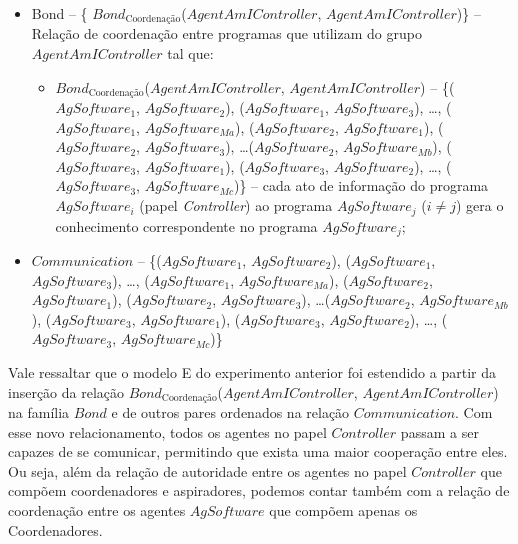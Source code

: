 \begin{itemize}
    \item Bond -- \{%
                $Bond_{\textrm{Coordenação}}$($AgentAmIController$, $AgentAmIController$)\}
    – Relação de coordenação entre programas que utilizam do grupo $AgentAmIController$  tal que:
    \begin{itemize}
        \item $Bond_{\textrm{Coordenação}}$($AgentAmIController$, $AgentAmIController$) -- \{($AgSoftware_1$, $AgSoftware_2$), ($AgSoftware_1$, $AgSoftware_3$), \ldots, ($AgSoftware_1$, $AgSoftware_{Ma}$), ($AgSoftware_2$, $AgSoftware_1$), ($AgSoftware_2$, $AgSoftware_3$), \ldots ($AgSoftware_2$, $AgSoftware_{Mb}$), ($AgSoftware_3$, $AgSoftware_1$), ($AgSoftware_3$, $AgSoftware_2$), \ldots, ($AgSoftware_3$, $AgSoftware_{Mc}$)\} – cada ato de informação do programa $AgSoftware_i$ (papel \textit{Controller}) ao programa $AgSoftware_j$ ($i \neq j$) gera o conhecimento correspondente no programa $AgSoftware_j$;
    \end{itemize}

    \item $Communication$ -- \{($AgSoftware_1$, $AgSoftware_2$), ($AgSoftware_1$, $AgSoftware_3$), \ldots, ($AgSoftware_1$, $AgSoftware_{Ma}$), ($AgSoftware_2$, $AgSoftware_1$), ($AgSoftware_2$, $AgSoftware_3$), \ldots ($AgSoftware_2$, $AgSoftware_{Mb}$), ($AgSoftware_3$, $AgSoftware_1$), ($AgSoftware_3$, $AgSoftware_2$), \ldots, ($AgSoftware_3$, $AgSoftware_{Mc}$)\}

\end{itemize}

\vspace{10px}

Vale ressaltar que o modelo E do experimento anterior foi estendido a partir da inserção da relação $Bond_{\textrm{Coordenação}}$($AgentAmIController$, $AgentAmIController$) na família $Bond$ e de outros pares ordenados na relação $Communication$. Com esse novo relacionamento, todos os agentes no papel $Controller$ passam a ser capazes de se comunicar, permitindo que exista uma maior cooperação entre eles. Ou seja, além da relação de autoridade entre os agentes no papel $Controller$ que compõem coordenadores e aspiradores, podemos contar também com a relação de coordenação entre os agentes $AgSoftware$ que compõem apenas os Coordenadores.

